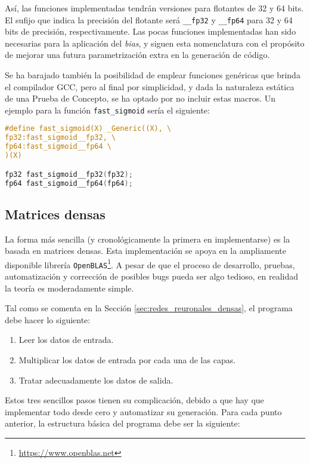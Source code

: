 Así, las funciones implementadas tendrán versiones para flotantes de 32 y 64 bits. El sufijo que indica la precisión del flotante será \texttt{\_\_fp32} y \texttt{\_\_fp64} para 32 y 64 bits de precisión, respectivamente. Las pocas funciones implementadas han sido necesarias para la aplicación del \textit{bias}, y siguen esta nomenclatura con el propósito de mejorar una futura parametrización extra en la generación de código.

Se ha barajado también la posibilidad de emplear funciones genéricas que brinda el compilador GCC, pero al final por simplicidad, y dada la naturaleza estática de una Prueba de Concepto, se ha optado por no incluir estas macros. Un ejemplo para la función \texttt{fast\_sigmoid} sería el siguiente:\medskip
\begin{lstlisting}[language=C]
#define fast_sigmoid(X) _Generic((X), \
fp32:fast_sigmoid__fp32, \
fp64:fast_sigmoid__fp64 \
)(X)

fp32 fast_sigmoid__fp32(fp32);
fp64 fast_sigmoid__fp64(fp64);
\end{lstlisting}


\subsection{Matrices densas}
\label{ssec:gdin_matrices_densas}
La forma más sencilla (y cronológicamente la primera en implementarse) es la basada en matrices densas. Esta implementación se apoya en la ampliamente disponible librería \texttt{OpenBLAS}\footnote{\url{https://www.openblas.net}}. A pesar de que el proceso de desarrollo, pruebas, automatización y corrección de posibles bugs pueda ser algo tedioso, en realidad la teoría es moderadamente simple.

Tal como se comenta en la Sección \ref{sec:redes_reuronales_densas}, el programa debe hacer lo siguiente:

\begin{enumerate}
    \item Leer los datos de entrada.
    \item Multiplicar los datos de entrada por cada una de las capas.
    \item Tratar adecuadamente los datos de salida.
\end{enumerate}

Estos tres sencillos pasos tienen su complicación, debido a que hay que implementar todo desde cero y automatizar su generación. Para cada punto anterior, la estructura básica del programa debe ser la siguiente:

